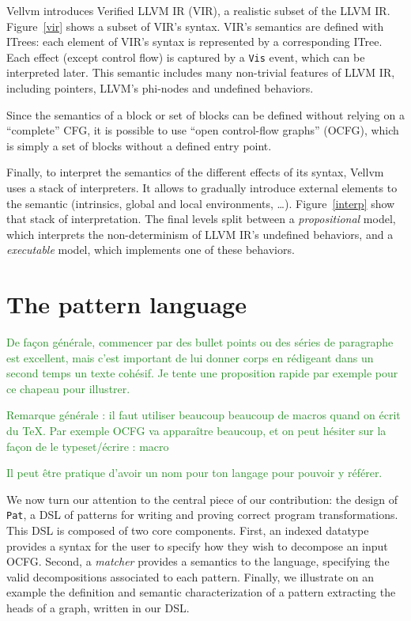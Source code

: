 \documentclass[11pt]{article}
\newcommand{\inlinecoq}[1]{\mbox{\lstinline[style=customcoq,columns=fixed,basewidth=.48em]{#1}}}
\newcommand{\ilc}[1]{\inlinecoq{#1}}
\newcommand{\yz}[1]{\textcolor{ForestGreen}{#1}}
\newcommand{\yzt}[1]{\textcolor{ForestGreen!50}{#1}}
\newcommand{\ocfg}{OCFG\xspace}
\newcommand{\pat}{\texttt{Pat}\xspace}
\begin{document}
Vellvm introduces Verified LLVM IR (VIR), a realistic subset of the LLVM IR. Figure~\ref{vir} shows a subset of VIR's syntax. VIR's semantics are defined with ITrees: each element of VIR's syntax is represented by a corresponding ITree. Each effect (except control flow) is captured by a \ilc{Vis} event, which can be interpreted later. This semantic includes many non-trivial features of LLVM IR, including pointers, LLVM's phi-nodes and undefined behaviors.

Since the semantics of a block or set of blocks can be defined without relying on a ``complete'' CFG, it is possible to use ``open control-flow graphs'' (\ocfg), which is simply a set of blocks without a defined entry point.

Finally, to interpret the semantics of the different effects of its syntax, Vellvm uses a stack of interpreters. It allows to gradually introduce external elements to the semantic (intrinsics, global and local environments, \ldots). Figure~\ref{interp} show that stack of interpretation. The final levels split between a \emph{propositional} model, which interprets the non-determinism of LLVM IR's undefined behaviors, and a \emph{executable} model, which implements one of these behaviors.

\section{The pattern language}
\label{sec:lang}

\yz{De façon générale, commencer par des bullet points ou des séries de paragraphe est excellent, mais c'est important de lui donner corps en rédigeant dans un second temps un texte cohésif. Je tente une proposition rapide par exemple pour ce chapeau pour illustrer.}

\yz{Remarque générale : il faut utiliser beaucoup beaucoup de macros quand on écrit du TeX. Par exemple OCFG va apparaître beaucoup, et on peut hésiter sur la façon de le typeset/écrire : macro }

\yz{Il peut être pratique d'avoir un nom pour ton langage pour pouvoir y référer.}

\yzt{We now turn our attention to the central piece of our contribution: the design of \pat{}, a DSL of patterns for writing and proving correct program transformations. This DSL is composed of two core components. First, an indexed datatype provides a syntax for the user to specify how they wish to decompose an input \ocfg. Second, a \emph{matcher} provides a semantics to the language, specifying the valid decompositions associated to each pattern. Finally, we illustrate on an example the definition and semantic characterization of a pattern extracting the heads of a graph, written in our DSL.}
\end{document}
